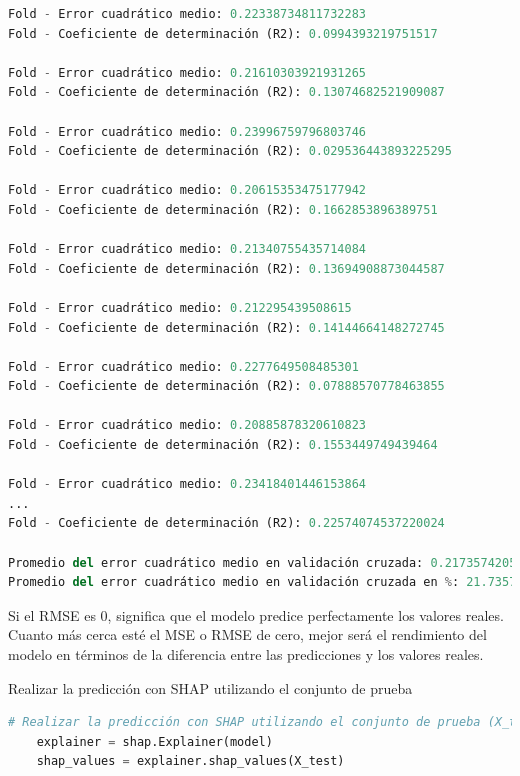 \begin{lstlisting}[language=Python, caption=Realizar Stratified K-Fold Cross-Validation en los datos de entrenamiento, label=lst:skfold_train]
    Fold - Error cuadrático medio: 0.22338734811732283
Fold - Coeficiente de determinación (R2): 0.0994393219751517

Fold - Error cuadrático medio: 0.21610303921931265
Fold - Coeficiente de determinación (R2): 0.13074682521909087

Fold - Error cuadrático medio: 0.23996759796803746
Fold - Coeficiente de determinación (R2): 0.029536443893225295

Fold - Error cuadrático medio: 0.20615353475177942
Fold - Coeficiente de determinación (R2): 0.1662853896389751

Fold - Error cuadrático medio: 0.21340755435714084
Fold - Coeficiente de determinación (R2): 0.13694908873044587

Fold - Error cuadrático medio: 0.212295439508615
Fold - Coeficiente de determinación (R2): 0.14144664148272745

Fold - Error cuadrático medio: 0.2277649508485301
Fold - Coeficiente de determinación (R2): 0.07888570778463855

Fold - Error cuadrático medio: 0.20885878320610823
Fold - Coeficiente de determinación (R2): 0.1553449749439464

Fold - Error cuadrático medio: 0.23418401446153864
...
Fold - Coeficiente de determinación (R2): 0.22574074537220024

Promedio del error cuadrático medio en validación cruzada: 0.21735742055519647
Promedio del error cuadrático medio en validación cruzada en %: 21.735742055519648
\end{lstlisting}

Si el RMSE es 0, significa que el modelo predice perfectamente los valores reales. Cuanto más cerca esté el MSE o RMSE de cero, mejor será el rendimiento del modelo en términos de la diferencia entre las predicciones y los valores reales.

Realizar la predicción con SHAP utilizando el conjunto de prueba

\begin{lstlisting}[language=Python, caption=Realizar Stratified K-Fold Cross-Validation en los datos de entrenamiento, label=lst:skfold_train]
    # Realizar la predicción con SHAP utilizando el conjunto de prueba (X_test)
    explainer = shap.Explainer(model)
    shap_values = explainer.shap_values(X_test)
\end{lstlisting}

